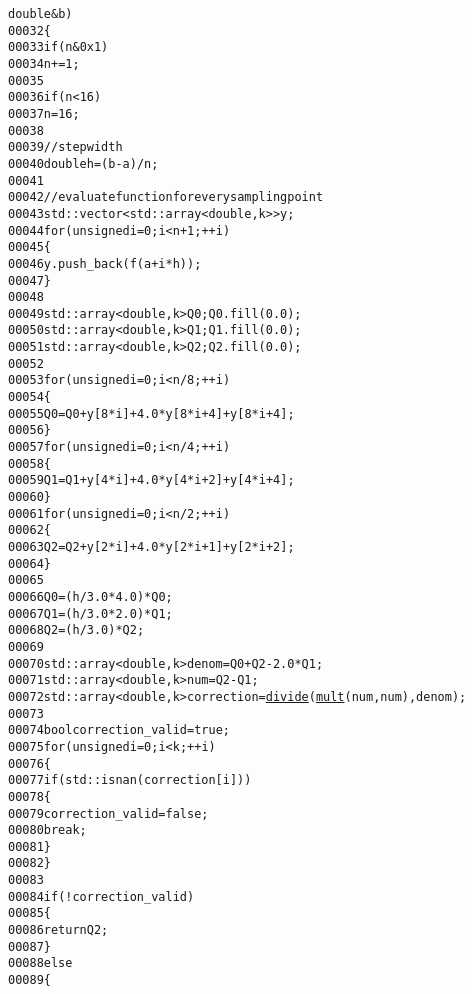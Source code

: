 \begin{footnotesize}
\begin{alltt}
      \textcolor{keywordtype}{double} & b)
00032     \{
00033         \textcolor{keywordflow}{if} (n & 0x1)
00034             n += 1;
00035 
00036         \textcolor{keywordflow}{if} (n < 16)
00037             n = 16;
00038 
00039         \textcolor{comment}{// step width}
00040         \textcolor{keywordtype}{double} h = (b - a) / n;
00041 
00042         \textcolor{comment}{// evaluate function for every sampling point}
00043         std::vector<std::array<double, k>> y;
00044         \textcolor{keywordflow}{for} (\textcolor{keywordtype}{unsigned} i = 0 ; i < n + 1 ; ++i)
00045         \{
00046             y.push\_back(f(a + i * h));
00047         \}
00048 
00049         std::array<double, k> Q0; Q0.fill(0.0);
00050         std::array<double, k> Q1; Q1.fill(0.0);
00051         std::array<double, k> Q2; Q2.fill(0.0);
00052 
00053         \textcolor{keywordflow}{for} (\textcolor{keywordtype}{unsigned} i = 0 ; i < n / 8 ; ++i)
00054         \{
00055             Q0 = Q0 + y[8 * i] + 4.0 * y[8 * i + 4] + y[8 * i + 4];
00056         \}
00057         \textcolor{keywordflow}{for} (\textcolor{keywordtype}{unsigned} i = 0 ; i < n / 4 ; ++i)
00058         \{
00059             Q1 = Q1 + y[4 * i] + 4.0 * y[4 * i + 2] + y[4 * i + 4];
00060         \}
00061         \textcolor{keywordflow}{for} (\textcolor{keywordtype}{unsigned} i = 0 ; i < n / 2 ; ++i)
00062         \{
00063             Q2 = Q2 + y[2 * i] + 4.0 * y[2 * i + 1] + y[2 * i + 2];
00064         \}
00065 
00066         Q0 = (h / 3.0 * 4.0) * Q0;
00067         Q1 = (h / 3.0 * 2.0) * Q1;
00068         Q2 = (h / 3.0) * Q2;
00069 
00070         std::array<double, k> denom = Q0 + Q2 - 2.0 * Q1;
00071         std::array<double, k> num = Q2 - Q1;
00072         std::array<double, k> correction = \hyperlink{namespaceeos_a8031207b4e14e35ca72988b76bfaacf1}{divide}(\hyperlink{namespaceeos_ae34de7634e8e232a4a7761b998e1535f}{mult}(num, num), denom);
00073 
00074         \textcolor{keywordtype}{bool} correction\_valid = \textcolor{keyword}{true};
00075         \textcolor{keywordflow}{for} (\textcolor{keywordtype}{unsigned} i = 0 ; i < k ; ++i)
00076         \{
00077             \textcolor{keywordflow}{if} (std::isnan(correction[i]))
00078             \{
00079                 correction\_valid = \textcolor{keyword}{false};
00080                 \textcolor{keywordflow}{break};
00081             \}
00082         \}
00083 
00084         \textcolor{keywordflow}{if} (!correction\_valid)
00085         \{
00086             \textcolor{keywordflow}{return} Q2;
00087         \}
00088         \textcolor{keywordflow}{else}
00089         \{

\end{alltt}
\end{footnotesize}
